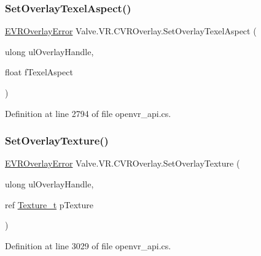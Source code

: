 \mbox{\label{class_valve_1_1_v_r_1_1_c_v_r_overlay_a4d1c10992a6ee3a4f110e7ffc8b117d9}} 
\subsubsection{\texorpdfstring{SetOverlayTexelAspect()}{SetOverlayTexelAspect()}}
{\footnotesize\ttfamily \mbox{\hyperlink{namespace_valve_1_1_v_r_aaee5c5144f42b7969d45b854f51b0c18}{E\+V\+R\+Overlay\+Error}} Valve.\+V\+R.\+C\+V\+R\+Overlay.\+Set\+Overlay\+Texel\+Aspect (\begin{DoxyParamCaption}\item[{ulong}]{ul\+Overlay\+Handle,  }\item[{float}]{f\+Texel\+Aspect }\end{DoxyParamCaption})}



Definition at line 2794 of file openvr\+\_\+api.\+cs.

\mbox{\label{class_valve_1_1_v_r_1_1_c_v_r_overlay_ae92d75776584ef4e1f63872d2fccf5f7}} 
\subsubsection{\texorpdfstring{SetOverlayTexture()}{SetOverlayTexture()}}
{\footnotesize\ttfamily \mbox{\hyperlink{namespace_valve_1_1_v_r_aaee5c5144f42b7969d45b854f51b0c18}{E\+V\+R\+Overlay\+Error}} Valve.\+V\+R.\+C\+V\+R\+Overlay.\+Set\+Overlay\+Texture (\begin{DoxyParamCaption}\item[{ulong}]{ul\+Overlay\+Handle,  }\item[{ref \mbox{\hyperlink{struct_valve_1_1_v_r_1_1_texture__t}{Texture\+\_\+t}}}]{p\+Texture }\end{DoxyParamCaption})}



Definition at line 3029 of file openvr\+\_\+api.\+cs.

\mbox{\label{class_valve_1_1_v_r_1_1_c_v_r_overlay_a8db6be23797cb69a764fac38be6bb046}} 
